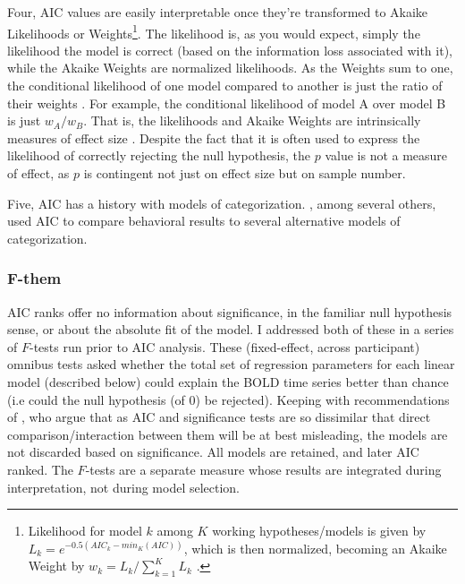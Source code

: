 \documentclass[doc,12pt]{apa}        %
\begin{document}
Four, AIC values are easily interpretable once they're transformed to Akaike Likelihoods or Weights\footnote{
    Likelihood for model $k$ among $K$ working hypotheses/models is given by $L_k = e^{-0.5({AIC}_k - {min}_{K}{(AIC)})}$, which is then normalized, becoming an Akaike Weight by $w_k = L_k / \sum\limits_{k=1}^K L_k$ \cite{Burnham:2004p9621}.}.  The likelihood is, as you would expect, simply the likelihood the model is correct (based on the information loss associated with it), while the Akaike Weights are normalized likelihoods.  As the Weights sum to one, the conditional likelihood of one model compared to another is just the ratio of their weights \cite{Burnham:2004p9621}.  For example, the conditional likelihood of model A over model B is just $w_A/w_B$.  That is, the likelihoods and Akaike Weights are intrinsically measures of effect size \cite{Anderson:2000p9475,Forster:2000p9623}.  Despite the fact that it is often used to express the likelihood of correctly rejecting the null hypothesis, the $p$ value is not a measure of effect, as $p$ is contingent not just on effect size but on sample number.  
    
    Five, AIC has a history with models of categorization. , among several others, used AIC to compare behavioral results to several alternative models of categorization.  

\subsubsection{F-them}
\label{subsub:F}
AIC ranks offer no information about significance, in the familiar null hypothesis sense, or about the absolute fit of the model.  I addressed both of these in a series of $F$-tests run prior to AIC analysis.  These (fixed-effect, across participant) omnibus tests asked whether the total set of regression parameters for each linear model (described below) could explain the BOLD time series better than chance (i.e could the null hypothesis (of 0) be rejected).  Keeping with recommendations of , who argue that as AIC and significance tests are so dissimilar that direct comparison/interaction between them will be at best misleading, the models are not discarded based on significance.  All models are retained, and later AIC ranked.  The $F$-tests are a separate measure whose results are integrated during interpretation, not during model selection.
\end{document}
